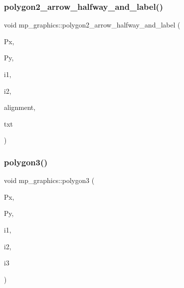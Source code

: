 \subsubsection{\texorpdfstring{polygon2\+\_\+arrow\+\_\+halfway\+\_\+and\+\_\+label()}{polygon2\_arrow\_halfway\_and\_label()}}
{\footnotesize\ttfamily void mp\+\_\+graphics\+::polygon2\+\_\+arrow\+\_\+halfway\+\_\+and\+\_\+label (\begin{DoxyParamCaption}\item[{\mbox{\hyperlink{galois_8h_a09fddde158a3a20bd2dcadb609de11dc}{I\+NT}} $\ast$}]{Px,  }\item[{\mbox{\hyperlink{galois_8h_a09fddde158a3a20bd2dcadb609de11dc}{I\+NT}} $\ast$}]{Py,  }\item[{\mbox{\hyperlink{galois_8h_a09fddde158a3a20bd2dcadb609de11dc}{I\+NT}}}]{i1,  }\item[{\mbox{\hyperlink{galois_8h_a09fddde158a3a20bd2dcadb609de11dc}{I\+NT}}}]{i2,  }\item[{const \mbox{\hyperlink{galois_8h_ab6cc7b4aeb6ea31aba2b3fbfc83ff5e6}{B\+Y\+TE}} $\ast$}]{alignment,  }\item[{const \mbox{\hyperlink{galois_8h_ab6cc7b4aeb6ea31aba2b3fbfc83ff5e6}{B\+Y\+TE}} $\ast$}]{txt }\end{DoxyParamCaption})}

\mbox{\label{classmp__graphics_a3684948a4acc33c084d0a613ff065575}} 
\subsubsection{\texorpdfstring{polygon3()}{polygon3()}}
{\footnotesize\ttfamily void mp\+\_\+graphics\+::polygon3 (\begin{DoxyParamCaption}\item[{\mbox{\hyperlink{galois_8h_a09fddde158a3a20bd2dcadb609de11dc}{I\+NT}} $\ast$}]{Px,  }\item[{\mbox{\hyperlink{galois_8h_a09fddde158a3a20bd2dcadb609de11dc}{I\+NT}} $\ast$}]{Py,  }\item[{\mbox{\hyperlink{galois_8h_a09fddde158a3a20bd2dcadb609de11dc}{I\+NT}}}]{i1,  }\item[{\mbox{\hyperlink{galois_8h_a09fddde158a3a20bd2dcadb609de11dc}{I\+NT}}}]{i2,  }\item[{\mbox{\hyperlink{galois_8h_a09fddde158a3a20bd2dcadb609de11dc}{I\+NT}}}]{i3 }\end{DoxyParamCaption})}

